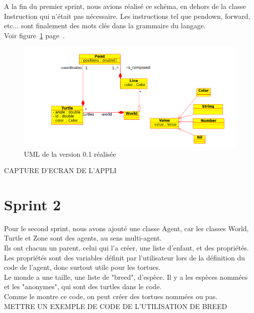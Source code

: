 A la fin du premier sprint, nous avions réalisé ce schéma, en dehors de la classe Instruction qui n'était pas nécessaire. Les instructions tel que pendown, forward, etc... sont finalement des mots clés dans la grammaire du langage.\\
Voir figure~\ref{v0.1R} page~\pageref{v0.1R}.
\begin{figure}[h]
\caption{\label{v0.1R} UML de la version 0.1 réalisée}
\includegraphics[scale=0.5]{doc/report/uml/v01reel.png}
\end{figure}
CAPTURE D'ECRAN DE L'APPLI

\section{Sprint 2}
Pour le second sprint, nous avons ajouté une classe Agent, car les classes World, Turtle et Zone sont des agents, au sens multi-agent.\\ Ils ont chacun un parent, celui qui l'a créer, une liste d'enfant, et des propriétés. Les propriétés sont des variables définit par l'utilisateur lors de la définition du code de l'agent, donc surtout utile pour les tortues.\\
Le monde a une taille, une liste de "breed", d'espèce. Il y a les espèces nommées et les "anonymes", qui sont des turtles dans le code.\\
Comme le montre ce code, on peut créer des tortues nommées ou pas.\\
METTRE UN EXEMPLE DE CODE DE L'UTILISATION DE BREED\\

